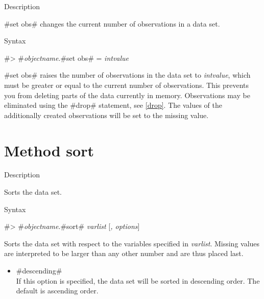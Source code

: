 \begin{stanza}{Description}

{#set obs# changes the current number of observations in a data
set.}
\end{stanza}


\begin{stanza}{Syntax}

{#> #{\em objectname}.#set obs# = {\em intvalue}

#set obs# raises the number of observations in the data set to
{\em intvalue}, which must be greater or equal to the current
number of observations. This prevents you from deleting parts of
the data currently in memory. Observations may be eliminated using
the #drop# statement, see \autoref{drop}. The values of the
additionally created observations will be set to the missing
value.}
\end{stanza}



\clearpage



\section{Method sort}
\label{sort}  


\begin{stanza}{Description}

{Sorts the data set.}
\end{stanza}


\begin{stanza}{Syntax}

{#> #{\em objectname}.#sort# {\em varlist}  [{\em , options}]

Sorts the data set with respect to the variables specified in {\em
varlist}. Missing values are interpreted to be larger than any
other number and are thus placed last.}
\end{stanza}



\begin{itemize}
\item #descending# \\
If this option is specified, the data set will be sorted in
descending order. The default is ascending order.
\end{itemize}



\clearpage



